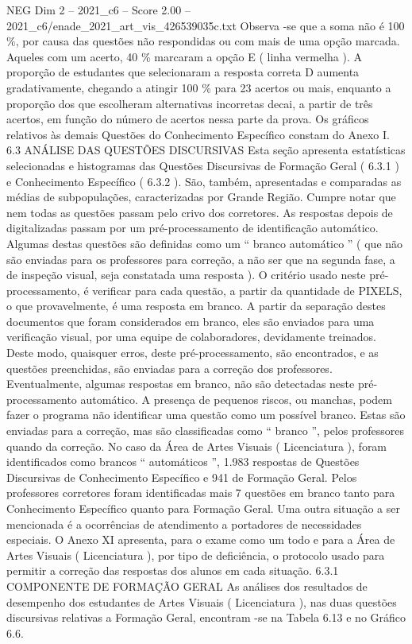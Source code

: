 \begin{textsample}{NEG Dim 2 – 2021\_c6 – Score 2.00 – 2021\_c6/enade\_2021\_art\_vis\_426539035c.txt}
Observa -se que a soma não é 100 \%, por causa das questões não respondidas ou com mais de uma opção marcada.
Aqueles com um acerto, 40 \% marcaram a opção E ( linha vermelha ).
A proporção de estudantes que selecionaram a resposta correta D aumenta gradativamente, chegando a atingir 100 \% para 23 acertos ou mais, enquanto a proporção dos que escolheram alternativas incorretas decai, a partir de três acertos, em função do número de acertos nessa parte da prova.
Os gráficos relativos às demais Questões do Conhecimento Específico constam do Anexo I. 6.3 ANÁLISE DAS QUESTÕES DISCURSIVAS Esta seção apresenta estatísticas selecionadas e histogramas das Questões Discursivas de Formação Geral ( 6.3.1 ) e Conhecimento Específico ( 6.3.2 ).
São, também, apresentadas e comparadas as médias de subpopulações, caracterizadas por Grande Região.
Cumpre notar que nem todas as questões passam pelo crivo dos corretores.
As respostas depois de digitalizadas passam por um pré-processamento de identificação automático.
Algumas destas questões são definidas como um “ branco automático ” ( que não são enviadas para os professores para correção, a não ser que na segunda fase, a de inspeção visual, seja constatada uma resposta ).
O critério usado neste pré-processamento, é verificar para cada questão, a partir da quantidade de PIXELS, o que provavelmente, é uma resposta em branco.
A partir da separação destes documentos que foram considerados em branco, eles são enviados para uma verificação visual, por uma equipe de colaboradores, devidamente treinados.
Deste modo, quaisquer erros, deste pré-processamento, são encontrados, e as questões preenchidas, são enviadas para a correção dos professores.
Eventualmente, algumas respostas em branco, não são detectadas neste pré-processamento automático.
A presença de pequenos riscos, ou manchas, podem fazer o programa não identificar uma questão como um possível branco.
Estas são enviadas para a correção, mas são classificadas como “ branco ”, pelos professores quando da correção.
No caso da Área de Artes Visuais ( Licenciatura ), foram identificados como brancos “ automáticos ”, 1.983 respostas de Questões Discursivas de Conhecimento Específico e 941 de Formação Geral.
Pelos professores corretores foram identificadas mais 7 questões em branco tanto para Conhecimento Específico quanto para Formação Geral.
Uma outra situação a ser mencionada é a ocorrências de atendimento a portadores de necessidades especiais.
O Anexo XI apresenta, para o exame como um todo e para a Área de Artes Visuais ( Licenciatura ), por tipo de deficiência, o protocolo usado para permitir a correção das respostas dos alunos em cada situação. 6.3.1 COMPONENTE DE FORMAÇÃO GERAL As análises dos resultados de desempenho dos estudantes de Artes Visuais ( Licenciatura ), nas duas questões discursivas relativas a Formação Geral, encontram -se na Tabela 6.13 e no Gráfico 6.6.

\end{textsample}
